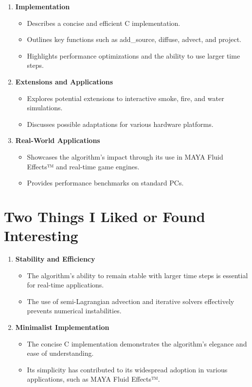 \documentclass[12pt]{article}
\begin{document}
\begin{enumerate}[noitemsep]
\begin{itemize}[noitemsep]
\begin{itemize}[noitemsep]
        \end{itemize}
    \end{itemize}
    \item \textbf{Implementation}
    \begin{itemize}[noitemsep]
        \item Describes a concise and efficient C implementation.
        \item Outlines key functions such as add\_source, diffuse, advect, and project.
        \item Highlights performance optimizations and the ability to use larger time steps.
    \end{itemize}
    \item \textbf{Extensions and Applications}
    \begin{itemize}[noitemsep]
        \item Explores potential extensions to interactive smoke, fire, and water simulations.
        \item Discusses possible adaptations for various hardware platforms.
    \end{itemize}
    \item \textbf{Real-World Applications}
    \begin{itemize}[noitemsep]
        \item Showcases the algorithm's impact through its use in MAYA Fluid Effects™ and real-time game engines.
        \item Provides performance benchmarks on standard PCs.
    \end{itemize}
\end{enumerate}

\section{Two Things I Liked or Found Interesting}
\begin{enumerate}[noitemsep]
    \item \textbf{Stability and Efficiency}
    \begin{itemize}[noitemsep]
        \item The algorithm's ability to remain stable with larger time steps is essential for real-time applications.
        \item The use of semi-Lagrangian advection and iterative solvers effectively prevents numerical instabilities.
    \end{itemize}
    \item \textbf{Minimalist Implementation}
    \begin{itemize}[noitemsep]
        \item The concise C implementation demonstrates the algorithm's elegance and ease of understanding.
        \item Its simplicity has contributed to its widespread adoption in various applications, such as MAYA Fluid Effects™.
    \end{itemize}
\end{enumerate}
\end{document}
